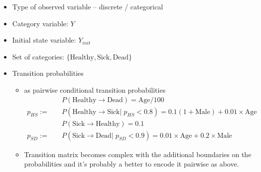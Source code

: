 \begin{itemize}
\item
Type of observed variable -- discrete / categorical
\item
Category variable: $Y$
\item
Initial state variable: $Y_{init}$
\item
Set of categories: $\{\mbox{Healthy}, \mbox{Sick}, \mbox{Dead}\}$
\item
Transition probabilities
\begin{itemize}
\item
as pairwise conditional transition probabilities
%
\begin{align}
& P(\mbox{Healthy} \rightarrow \mbox{Dead}) = \mbox{Age}/100 \nonumber \\
p_{HS} := \quad & P(\mbox{Healthy} \rightarrow \mbox{Sick} | \; p_{HS} < 0.8) = 0.1(1 + \mbox{Male}) + 0.01\times\mbox{Age} \nonumber \\
& P(\mbox{Sick} \rightarrow \mbox{Healthy}) = 0.1 \nonumber \\
p_{SD} := \quad & P(\mbox{Sick} \rightarrow \mbox{Dead} | \; p_{SD} < 0.9) = 0.01\times\mbox{Age}+0.2\times\mbox{Male} \nonumber
\end{align}
\item
Transition matrix becomes complex with the additional boundaries
on the probabilities and it's probably a better to encode it pairwise
as above.
\end{itemize}
\end{itemize}



